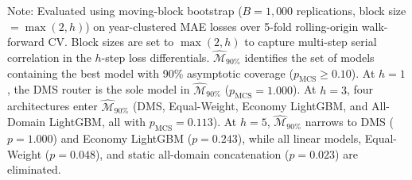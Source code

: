 \documentclass[11pt,a4paper]{article}
\begin{document}
\begin{table}[ht]
\centering
\small
\caption{Hansen, Lunde \& Nason (2011) Model Confidence Set ($\widehat{\mathcal{M}}_{90\%}$) across forecast horizons}
\label{tab:mcs_results}
\begin{flushleft}
\footnotesize Note: Evaluated using moving-block bootstrap ($B=1,000$ replications, block size $= \max(2, h)$) on year-clustered MAE losses over 5-fold rolling-origin walk-forward CV. Block sizes are set to $\max(2, h)$ to capture multi-step serial correlation in the $h$-step loss differentials. $\widehat{\mathcal{M}}_{90\%}$ identifies the set of models containing the best model with 90\% asymptotic coverage ($p_{\text{MCS}} \ge 0.10$). At $h=1$, the DMS router is the sole model in $\widehat{\mathcal{M}}_{90\%}$ ($p_{\text{MCS}} = 1.000$). At $h=3$, four architectures enter $\widehat{\mathcal{M}}_{90\%}$ (DMS, Equal-Weight, Economy LightGBM, and All-Domain LightGBM, all with $p_{\text{MCS}} = 0.113$). At $h=5$, $\widehat{\mathcal{M}}_{90\%}$ narrows to DMS ($p=1.000$) and Economy LightGBM ($p=0.243$), while all linear models, Equal-Weight ($p=0.048$), and static all-domain concatenation ($p=0.023$) are eliminated.
\end{flushleft}
\end{table}
\end{document}
